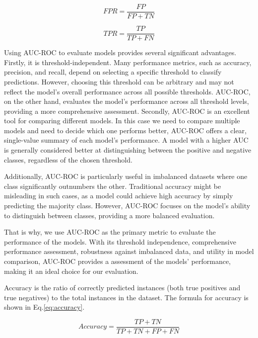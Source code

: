 \documentclass[../main.tex]{subfiles}
\begin{document}
\begin{equation}
    \label{eq:fpr}
    FPR = \frac{FP}{FP + TN}
\end{equation}

\begin{equation}
    \label{eq:tpr}
    TPR = \frac{TP}{TP + FN}
\end{equation}

Using AUC-ROC to evaluate models provides several significant advantages.
Firstly, it is threshold-independent.
Many performance metrics, such as accuracy, precision, and recall, depend on selecting a specific threshold to classify predictions.
However, choosing this threshold can be arbitrary and may not reflect the model's overall performance across all possible thresholds.
AUC-ROC, on the other hand, evaluates the model's performance across all threshold levels, providing a more comprehensive assessment.
Secondly, AUC-ROC is an excellent tool for comparing different models.
In this case we need to compare multiple models and need to decide which one performs better, AUC-ROC offers a clear, single-value summary of each model's performance.
A model with a higher \gls{AUC} is generally considered better at distinguishing between the positive and negative classes, regardless of the chosen threshold.

Additionally, AUC-ROC is particularly useful in imbalanced datasets where one class significantly outnumbers the other.
Traditional accuracy might be misleading in such cases, as a model could achieve high accuracy by simply predicting the majority class.
However, AUC-ROC focuses on the model's ability to distinguish between classes, providing a more balanced evaluation.

That is why, we use AUC-ROC as the primary metric to evaluate the performance of the models. With its threshold independence, comprehensive performance assessment, robustness against imbalanced data, and utility in model comparison, AUC-ROC provides a  assessment of the models' performance, making it an ideal choice for our evaluation.

Accuracy is the ratio of correctly predicted instances (both true positives and true negatives) to the total instances in the dataset.
The formula for accuracy is shown in Eq.\ref{eq:accuracy}.

\begin{equation}
    \label{eq:accuracy}
    Accuracy = \frac{TP + TN}{TP + TN + FP + FN}
\end{equation}
\end{document}
